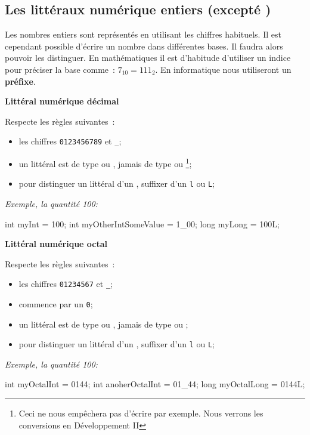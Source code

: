 \subsection{Les littéraux numérique entiers (excepté )}

Les nombres entiers sont représentés en utilisant les chiffres habituels. Il
est cependant possible d'écrire un nombre dans différentes bases. Il faudra
alors pouvoir les distinguer. En mathématiques il est d'habitude d'utiliser un
indice pour préciser la base comme : $7_{10} = 111_2$. En informatique nous
utiliseront un \textbf{préfixe}. 

\textbf{Littéral numérique décimal}

Respecte les règles suivantes~:

\begin{itemize}
	\item les chiffres \texttt{0123456789} et \texttt{\_};
	\item un littéral est de type  ou , jamais de type 
		 ou \footnote{Ceci ne nous empêchera pas d'écrire 
		 par exemple. Nous verrons les conversions en 
		Développement II};
	\item pour distinguer un littéral  d'un , suffixer 
		d'un \texttt{l} ou \texttt{L};
\end{itemize}

\textit{Exemple, la quantité 100: }
\begin{java}
	int myInt = 100;
	int myOtherIntSomeValue = 1_00;
	long myLong = 100L;
\end{java}

\textbf{Littéral numérique octal}

Respecte les règles suivantes~:

\begin{itemize}
	\item les chiffres \texttt{01234567} et \texttt{\_};
	\item commence par un \texttt{0};
	\item un littéral est de type  ou , jamais de type 
		 ou ;
	\item pour distinguer un littéral  d'un , suffixer 
		d'un \texttt{l} ou \texttt{L};
\end{itemize}

\textit{Exemple, la quantité 100: }
\begin{java}
	int myOctalInt = 0144;
	int anoherOctalInt = 01_44;
	long myOctalLong = 0144L;
\end{java}

